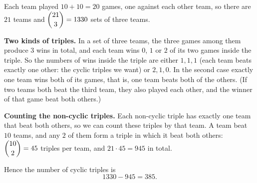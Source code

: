 Each team played $10+10=20$ games, one against each other team, so there are $21$ teams and $\dbinom{21}{3}=1330$ sets of three teams.

\textbf{Two kinds of triples.} In a set of three teams, the three games among them produce $3$ wins in total, and each team wins $0$, $1$ or $2$ of its two games inside the triple. So the numbers of wins inside the triple are either $1,1,1$ (each team beats exactly one other: the cyclic triples we want) or $2,1,0$. In the second case exactly one team wins both of its games, that is, one team beats both of the others. (If two teams both beat the third team, they also played each other, and the winner of that game beat both others.)

\textbf{Counting the non-cyclic triples.} Each non-cyclic triple has exactly one team that beat both others, so we can count these triples by that team. A team beat $10$ teams, and any $2$ of them form a triple in which it beat both others: $\dbinom{10}{2}=45$ triples per team, and $21\cdot45=945$ in total.

Hence the number of cyclic triples is
\[1330-945=\boxed{385}.\]
